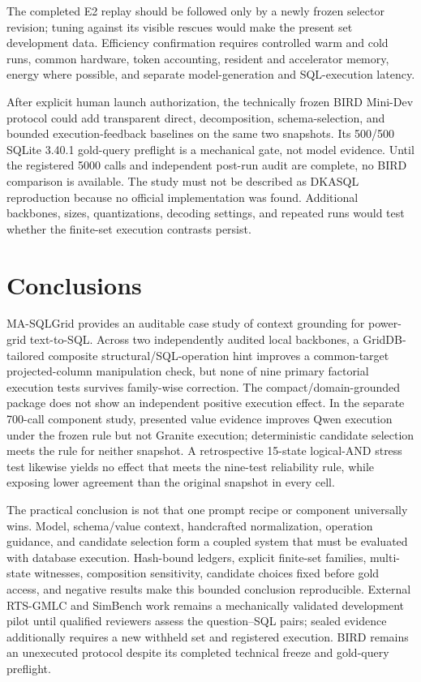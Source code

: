 \documentclass[applsci,article,submit,moreauthors]{Definitions/mdpi}
\newcommand{\masql}{MA-SQLGrid}
\begin{document}
The completed E2 replay should be followed only by a newly frozen selector revision; tuning against its visible rescues would make the present set development data. Efficiency confirmation requires controlled warm and cold runs, common hardware, token accounting, resident and accelerator memory, energy where possible, and separate model-generation and SQL-execution latency.

After explicit human launch authorization, the technically frozen BIRD Mini-Dev protocol could add transparent direct, decomposition, schema-selection, and bounded execution-feedback baselines on the same two snapshots. Its 500/500 SQLite 3.40.1 gold-query preflight is a mechanical gate, not model evidence. Until the registered 5000 calls and independent post-run audit are complete, no BIRD comparison is available. The study must not be described as DKASQL reproduction because no official implementation was found. Additional backbones, sizes, quantizations, decoding settings, and repeated runs would test whether the finite-set execution contrasts persist.

\section{Conclusions}
\masql{} provides an auditable case study of context grounding for power-grid text-to-SQL. Across two independently audited local backbones, a GridDB-tailored composite structural/SQL-operation hint improves a common-target projected-column manipulation check, but none of nine primary factorial execution tests survives family-wise correction. The compact/domain-grounded package does not show an independent positive execution effect. In the separate 700-call component study, presented value evidence improves Qwen execution under the frozen rule but not Granite execution; deterministic candidate selection meets the rule for neither snapshot. A retrospective 15-state logical-AND stress test likewise yields no effect that meets the nine-test reliability rule, while exposing lower agreement than the original snapshot in every cell.

The practical conclusion is not that one prompt recipe or component universally wins. Model, schema/value context, handcrafted normalization, operation guidance, and candidate selection form a coupled system that must be evaluated with database execution. Hash-bound ledgers, explicit finite-set families, multi-state witnesses, composition sensitivity, candidate choices fixed before gold access, and negative results make this bounded conclusion reproducible. External RTS-GMLC and SimBench work remains a mechanically validated development pilot until qualified reviewers assess the question--SQL pairs; sealed evidence additionally requires a new withheld set and registered execution. BIRD remains an unexecuted protocol despite its completed technical freeze and gold-query preflight.
\end{document}
